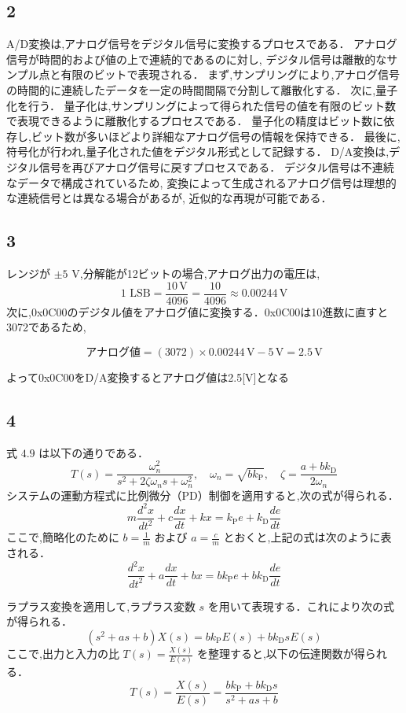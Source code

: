 \subsection*{2}
A/D変換は,アナログ信号をデジタル信号に変換するプロセスである．
アナログ信号が時間的および値の上で連続的であるのに対し,
デジタル信号は離散的なサンプル点と有限のビットで表現される．
まず,サンプリングにより,アナログ信号の時間的に連続したデータを一定の時間間隔で分割して離散化する．
次に,量子化を行う．
量子化は,サンプリングによって得られた信号の値を有限のビット数で表現できるように離散化するプロセスである．
量子化の精度はビット数に依存し,ビット数が多いほどより詳細なアナログ信号の情報を保持できる．
最後に,符号化が行われ,量子化された値をデジタル形式として記録する．
D/A変換は,デジタル信号を再びアナログ信号に戻すプロセスである．
デジタル信号は不連続なデータで構成されているため,
変換によって生成されるアナログ信号は理想的な連続信号とは異なる場合があるが,
近似的な再現が可能である．


\subsection*{3}
レンジが \(\pm 5\) V,分解能が12ビットの場合,アナログ出力の電圧は,
\[
  \text{1 LSB} = \frac{10 \, \text{V}}{4096} = \frac{10}{4096} \approx 0.00244 \, \text{V}
\]
次に,0x0C00のデジタル値をアナログ値に変換する．0x0C00は10進数に直すと3072であるため,

\[
  \text{アナログ値} = (3072) \times 0.00244 \, \text{V} - 5 \, \text{V} = 2.5 \, \text{V}
\]

よって0x0C00をD/A変換するとアナログ値は2.5[V]となる

\subsection*{4}
式 \(4.9\) は以下の通りである．
\[
  T(s) = \frac{\omega_n^2}{s^2 + 2 \zeta \omega_n s + \omega_n^2}, \quad \omega_n = \sqrt{b k_{\mathrm{P}}}, \quad \zeta = \frac{a + b k_{\mathrm{D}}}{2 \omega_n}
\]
システムの運動方程式に比例微分（PD）制御を適用すると,次の式が得られる．
\[
  m \frac{d^2 x}{dt^2} + c \frac{dx}{dt} + kx = k_{\mathrm{P}} e + k_{\mathrm{D}} \frac{de}{dt}
\]
ここで,簡略化のために \( b = \frac{1}{m} \) および \( a = \frac{c}{m} \) とおくと,上記の式は次のように表される．
\[
  \frac{d^2 x}{dt^2} + a \frac{dx}{dt} + bx = b k_{\mathrm{P}} e + b k_{\mathrm{D}} \frac{de}{dt}
\]

ラプラス変換を適用して,ラプラス変数 \( s \) を用いて表現する．これにより次の式が得られる．
\[
  (s^2 + as + b) X(s) = b k_{\mathrm{P}} E(s) + b k_{\mathrm{D}} s E(s)
\]
ここで,出力と入力の比 \( T(s) = \frac{X(s)}{E(s)} \) を整理すると,以下の伝達関数が得られる．
\[
  T(s) = \frac{X(s)}{E(s)} = \frac{b k_{\mathrm{P}} + b k_{\mathrm{D}} s}{s^2 + as + b}
\]

